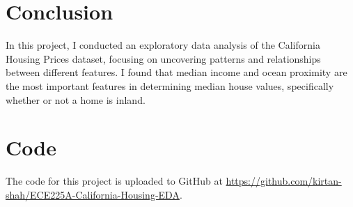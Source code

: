 \documentclass[letterpaper,twocolumn,10pt]{article}
\begin{document}
\section{Conclusion}
In this project, I conducted an exploratory data analysis of the California Housing Prices dataset, focusing on uncovering patterns and relationships between different features.
I found that median income and ocean proximity are the most important features in determining median house values, specifically whether or not a home is inland.


\section{Code}
\begin{flushleft}
The code for this project is uploaded to GitHub at \url{https://github.com/kirtan-shah/ECE225A-California-Housing-EDA}.
\end{flushleft}

{\footnotesize 
}
\end{document}
